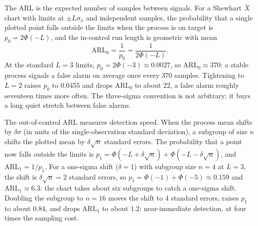 The ARL is the expected number of samples between signals. For a
Shewhart $\bar{X}$ chart with limits at $\pm L\sigma_{\bar{x}}$ and
independent samples, the probability that a single plotted point
falls outside the limits when the process is on target is
$p_{0} = 2\Phi(-L)$, and the in-control run length is geometric
with mean
\[
\text{ARL}_{0} = \frac{1}{p_{0}} = \frac{1}{2\Phi(-L)}.
\]
At the standard $L = 3$ limits, $p_{0} = 2\Phi(-3) \approx 0.0027$,
so $\text{ARL}_{0} \approx 370$: a stable process signals a false
alarm on average once every $370$ samples. Tightening to
$L = 2$ raises $p_{0}$ to $0.0455$ and drops $\text{ARL}_{0}$ to
about $22$, a false alarm roughly seventeen times more often. The
three-sigma convention is not arbitrary; it buys a long quiet
stretch between false alarms.

The out-of-control ARL measures detection speed. When the process
mean shifts by $\delta\sigma$ (in units of the single-observation
standard deviation), a subgroup of size $n$ shifts the plotted mean
by $\delta\sqrt{n}$ standard errors. The probability that a point
now falls outside the limits is
$p_{1} = \Phi(-L + \delta\sqrt{n}) + \Phi(-L - \delta\sqrt{n})$,
and $\text{ARL}_{1} = 1/p_{1}$. For a one-sigma shift
($\delta = 1$) with subgroup size $n = 4$ at $L = 3$, the shift is
$\delta\sqrt{n} = 2$ standard errors, so
$p_{1} = \Phi(-1) + \Phi(-5) \approx 0.159$ and
$\text{ARL}_{1} \approx 6.3$: the chart takes about six subgroups
to catch a one-sigma shift. Doubling the subgroup to $n = 16$
moves the shift to $4$ standard errors, raises $p_{1}$ to about
$0.84$, and drops $\text{ARL}_{1}$ to about $1.2$: near-immediate
detection, at four times the sampling cost.

